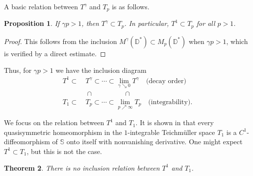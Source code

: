 \documentclass[amstex,12pt,reqno]{amsart}
\newtheorem{theorem}{Theorem}[section]
\newtheorem{proposition}[theorem]{Proposition}
\theoremstyle{definition}
\begin{document}
A basic relation between $T^\gamma$ and $T_p$ is as follows.

\begin{proposition}
If $\gamma p>1$, then $T^\gamma \subset T_p$. In particular, $T^1 \subset T_p$ for all $p>1$.
\end{proposition}

\begin{proof}
This follows from the inclusion $M^\gamma(\mathbb D^*) \subset M_p(\mathbb D^*)$ when $\gamma p>1$,
which is verified by a direct estimate.
\end{proof}

Thus, for $\gamma p>1$ we have the inclusion diagram
\begin{align*}
T^1 \subset &\ T^\gamma \subset \cdots \subset \lim_{\gamma \searrow 0}T^\gamma \quad \text{(decay order)}\\
&\ \cap \qquad \qquad \ \ \cap\\
T_1 \subset &\ T_p \subset \cdots \subset \lim_{p \nearrow \infty}T_p \quad \text{(integrability)}.
\end{align*}

We focus on the relation between $T^1$ and $T_1$. It is shown in \cite{AB} that
every quasisymmetric homeomorphism in the $1$-integrable Teich\-m\"ul\-ler space $T_1$ is
a $C^1$-diffeomorphism of $\mathbb S$ onto itself with nonvanishing derivative.
One might expect $T^1 \subset T_1$, but this is not the case.

\begin{theorem}\label{inclusion}
There is no inclusion relation between $T^1$ and $T_1$. 
\end{theorem}
\end{document}
